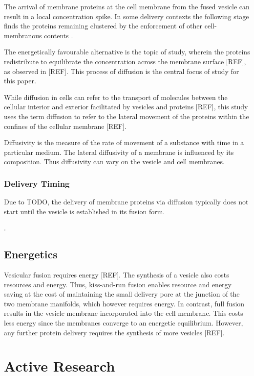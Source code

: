 \documentclass{report}
\begin{document}
The arrival of membrane proteins at the cell membrane from the fused vesicle can result in a local concentration spike. In some delivery contexts the following stage finds the proteins remaining clustered by the enforcement of other cell-membranous contents \cite{lillemeier2006plasma, willig2006sted}.

The energetically favourable alternative is the topic of study, wherein the proteins redistribute to equilibrate the concentration across the membrane surface [REF], as observed in [REF]. This process of diffusion is the central focus of study for this paper.

While diffusion in cells can refer to the transport of molecules between the cellular interior and exterior facilitated by vesicles and proteins [REF], this study uses the term diffusion to refer to the lateral movement of the proteins within the confines of the cellular membrane [REF].

Diffusivity is the measure of the rate of movement of a substance with time in a particular medium. The lateral diffusivity of a membrane is influenced by its composition. Thus diffusivity can vary on the vesicle and cell membranes.

\subsection{Delivery Timing}
Due to TODO, the delivery of membrane proteins via diffusion typically does not start until the vesicle is established in its fusion form.

\cite{soykan2017synaptic}.

\section{Energetics}
Vesicular fusion requires energy [REF]. The synthesis of a vesicle also costs resources and energy. Thus, kiss-and-run fusion enables resource and energy saving at the cost of maintaining the small delivery pore at the junction of the two membrane manifolds, which however requires energy. In contrast, full fusion results in the vesicle membrane incorporated into the cell membrane. This costs less energy since the membranes converge to an energetic equilibrium. However, any further protein delivery requires the synthesis of more vesicles [REF].

\chapter{Active Research}
\end{document}
